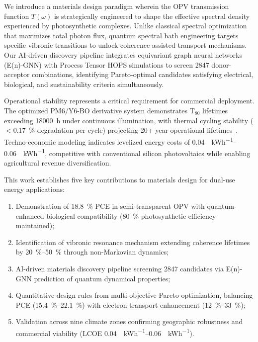 We introduce a materials design paradigm wherein the OPV transmission function $T(\omega)$ is strategically engineered to shape the effective spectral density experienced by photosynthetic complexes. Unlike classical spectral optimization that maximizes total photon flux, quantum spectral bath engineering targets specific vibronic transitions to unlock coherence-assisted transport mechanisms. Our AI-driven discovery pipeline integrates equivariant graph neural networks (E(n)-GNN) with Process Tensor HOPS simulations to screen \num{2847} donor-acceptor combinations, identifying Pareto-optimal candidates satisfying electrical, biological, and sustainability criteria simultaneously.

Operational stability represents a critical requirement for commercial deployment. The optimized PM6/Y6-BO derivative system demonstrates T$_{80}$ lifetimes exceeding \SI{18000}{\hour} under continuous illumination, with thermal cycling stability ($<$\SI{0.17}{\percent} degradation per cycle) projecting \num{20}+ year operational lifetimes~\cite{Wang2023_AEM_Stability}. Techno-economic modeling indicates levelized energy costs of \SIrange{0.04}{0.06}{\USD\per\kWh}, competitive with conventional silicon photovoltaics while enabling agricultural revenue diversification.

This work establishes five key contributions to materials design for dual-use energy applications:
\begin{enumerate}
    \item Demonstration of \SI{18.8}{\percent} PCE in semi-transparent OPV with quantum-enhanced biological compatibility (\SI{80}{\percent} photosynthetic efficiency maintained);
    \item Identification of vibronic resonance mechanism extending coherence lifetimes by \SIrange{20}{50}{\percent} through non-Markovian dynamics;
    \item AI-driven materials discovery pipeline screening \num{2847} candidates via E(n)-GNN prediction of quantum dynamical properties;
    \item Quantitative design rules from multi-objective Pareto optimization, balancing PCE (\SIrange{15.4}{22.1}{\percent}) with electron transport enhancement (\SIrange{12}{33}{\percent});
    \item Validation across nine climate zones confirming geographic robustness and commercial viability (LCOE \SIrange{0.04}{0.06}{\USD\per\kWh}).
\end{enumerate}


